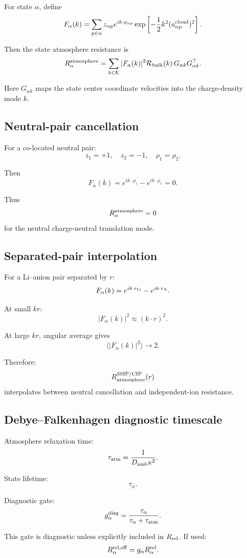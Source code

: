 For state \(\alpha\), define
\[
F_\alpha(k)
=
\sum_{p\in\alpha} z_{\alpha p}
e^{ik\cdot \rho_{\alpha p}}
\exp\left[-\frac12k^2(a_{\alpha p}^{\rm cloud})^2\right].
\]

Then the state atmosphere resistance is
\[
R_\alpha^{\rm atmosphere}
=
\sum_{k\in\mathcal K}
|F_\alpha(k)|^2
\mathcal R_{\rm bulk}(k)
\,G_{\alpha k}G_{\alpha k}^\top.
\]

Here \(G_{\alpha k}\) maps the state center coordinate velocities into the
charge-density mode \(k\).

\subsection{Neutral-pair cancellation}

For a co-located neutral pair:
\[
z_1=+1,\quad z_2=-1,\quad \rho_1=\rho_2.
\]

Then
\[
F_\alpha(k)=e^{ik\cdot\rho_1}-e^{ik\cdot\rho_1}=0.
\]

Thus
\[
R_\alpha^{\rm atmosphere}=0
\]
for the neutral charge-neutral translation mode.

\subsection{Separated-pair interpolation}

For a Li--anion pair separated by \(r\):
\[
F_\alpha(k)=e^{ik\cdot r_{\rm Li}}-e^{ik\cdot r_{\rm A}}.
\]

At small \(kr\):
\[
|F_\alpha(k)|^2\approx (k\cdot r)^2.
\]

At large \(kr\), angular average gives
\[
\langle |F_\alpha(k)|^2\rangle\to2.
\]

Therefore:
\[
R_{\rm atmosphere}^{\rm SSIP/CIP}(r)
\]
interpolates between neutral cancellation and independent-ion resistance.

\subsection{Debye--Falkenhagen diagnostic timescale}

Atmosphere relaxation time:
\[
\tau_{\rm atm}=\frac{1}{D_{\rm amb}\kappa^2}.
\]

State lifetime:
\[
\tau_\alpha.
\]

Diagnostic gate:
\[
g_\alpha^{\rm diag}
=
\frac{\tau_\alpha}{\tau_\alpha+\tau_{\rm atm}}.
\]

This gate is diagnostic unless explicitly included in \(R_{\rm rel}\). If used:
\[
R_{\alpha}^{\rm rel,eff}
=
g_\alpha R_{\alpha}^{\rm rel}.
\]

